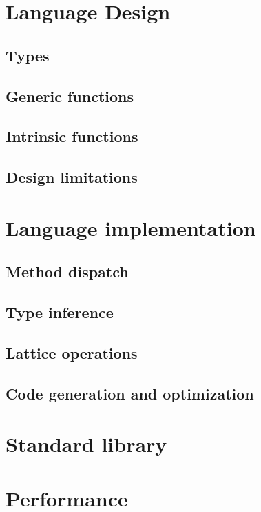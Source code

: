\documentclass[11pt]{sigplanconf}
\begin{document}

\section{Language Design}

\subsection{Types}
\subsection{Generic functions}
\subsection{Intrinsic functions}
\subsection{Design limitations}

\section{Language implementation}
\subsection{Method dispatch}
\subsection{Type inference}
\subsection{Lattice operations}
\subsection{Code generation and optimization}

\section{Standard library}

\section{Performance}
\end{document}

